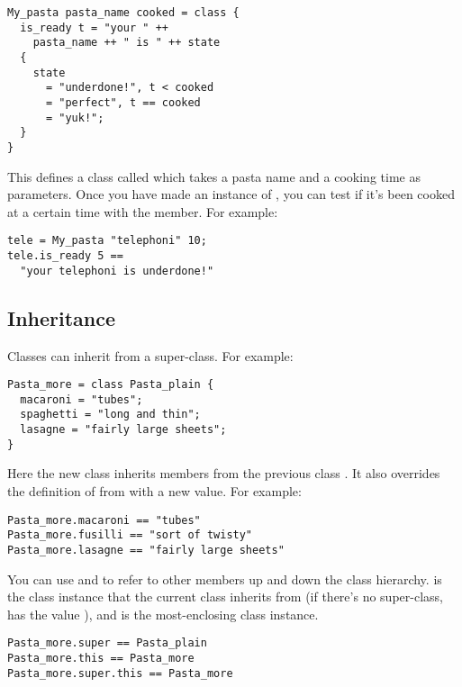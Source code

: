 \begin{verbatim}
My_pasta pasta_name cooked = class {
  is_ready t = "your " ++ 
    pasta_name ++ " is " ++ state
  {
    state
      = "underdone!", t < cooked
      = "perfect", t == cooked
      = "yuk!";
  }
}
\end{verbatim}

\noindent
This defines a class called  which takes a pasta name
and a cooking time as parameters. Once you have made an instance of
, you can test if it's been cooked at a certain time with the
 member. For example:

\begin{verbatim}
tele = My_pasta "telephoni" 10;
tele.is_ready 5 == 
  "your telephoni is underdone!"
\end{verbatim}

\subsection{Inheritance}

Classes can inherit from a super-class. For example:

\begin{verbatim}
Pasta_more = class Pasta_plain { 
  macaroni = "tubes";
  spaghetti = "long and thin";
  lasagne = "fairly large sheets";
}
\end{verbatim}

\noindent
Here the new class  inherits members from the previous class
. It also overrides the definition of  from
 with a new value. For example:

\begin{verbatim}
Pasta_more.macaroni == "tubes"
Pasta_more.fusilli == "sort of twisty"
Pasta_more.lasagne == "fairly large sheets"
\end{verbatim}

You can use  and
 to refer to other members up and down the class hierarchy.
 is the class instance that the current class inherits from (if
there's no super-class,  has the value \ct{[]}), and
 is the most-enclosing class instance. 

\begin{verbatim}
Pasta_more.super == Pasta_plain
Pasta_more.this == Pasta_more
Pasta_more.super.this == Pasta_more 
\end{verbatim}

